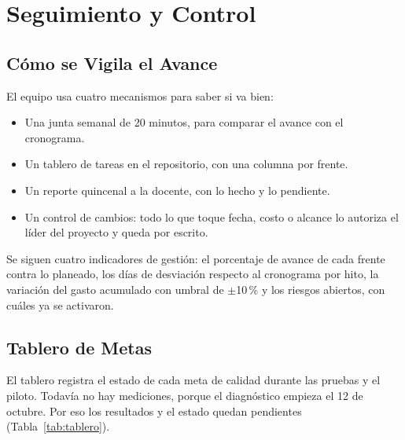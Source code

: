 \section{Seguimiento y Control}
\subsection{Cómo se Vigila el Avance}
El equipo usa cuatro mecanismos para saber si va bien:
\begin{itemize}
	\item Una junta semanal de 20 minutos, para comparar el avance con el
	      cronograma.
	\item Un tablero de tareas en el repositorio, con una columna por frente.
	\item Un reporte quincenal a la docente, con lo hecho y lo pendiente.
	\item Un control de cambios: todo lo que toque fecha, costo o alcance lo
	      autoriza el líder del proyecto y queda por escrito.
\end{itemize}
Se siguen cuatro indicadores de gestión: el porcentaje de avance de cada frente
contra lo planeado, los días de desviación respecto al cronograma por hito, la
variación del gasto acumulado con umbral de $\pm$10\,\% y los riesgos abiertos,
con cuáles ya se activaron.

\subsection{Tablero de Metas}
El tablero registra el estado de cada meta de calidad durante las pruebas y el
piloto. Todavía no hay mediciones, porque el diagnóstico empieza el 12 de
octubre. Por eso los resultados y el estado quedan pendientes
(Tabla~\ref{tab:tablero}).

